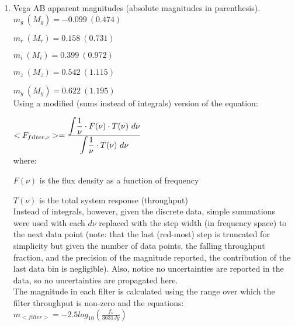 \documentclass[11pt]{article}
\begin{document}
\begin{enumerate}
\begin{enumerate}
\newpage 
 
	 \item %
	 Vega AB apparent magnitudes (absolute magnitudes in parenthesis).\\
	 
	 \hspace{10mm}$m_{g}\ (M_{g}) = -0.099\ (0.474)$
	 
	 \hspace{10mm}$m_{r}\ (M_{r}) = 0.158\ (0.731)$
	 	  
	 \hspace{10mm}$m_{i}\ (M_{i}) =  0.399\ (0.972)$
	 
	 \hspace{10mm}$m_{z}\ (M_{z}) = 0.542\ (1.115)$
	 
	 \hspace{10mm}$m_{y}\ (M_{y}) = 0.622\ (1.195)$\\
	 	 
	 Using a modified (sums instead of integrals) version of the equation:
		 
		 	\hspace{10mm} $<F_{filter,\nu}> = \frac{\displaystyle \mathlarger{\int} \frac{1}{\nu} \cdot F(\nu) \cdot T(\nu)\ d\nu}{\displaystyle \mathlarger{\int} \frac{1}{\nu} \cdot T(\nu)\ d\nu}$ \\
		 	
		 	where:
		 	
		 	 \hspace {10mm}$F(\nu)$ is the flux density as a function of frequency 
		 	 
		 	 \hspace{10mm} $T(\nu)$ is the total system response (throughput)\\
		 	 
 	 
		Instead of integrals, however, given the discrete data, simple summations were used with each $d\nu$ replaced with the step width (in frequency space) to the next data point (note: that the last (red-most) step is truncated for simplicity but given the number of data points, the falling throughput fraction, and the precision of the magnitude reported, the contribution of the last data bin is negligible). Also, notice no uncertainties are reported in the data, so no uncertainties are propagated here.\\
		
		The magnitude in each filter is calculated using the range over which the filter throughput is non-zero and the equations:\\
			
			 \hspace{10mm} $m_{<filter>} = -2.5 log_{10}(\frac{\displaystyle f_{\nu}}{3631 Jy})$\\
			 

\end{enumerate}
\end{enumerate}
\end{document}
